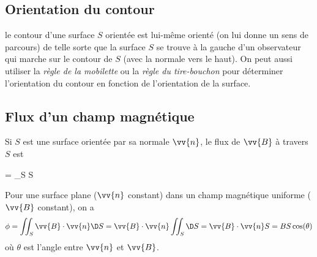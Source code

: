 \documentclass{cours}
\begin{document}
\subsection{Orientation du contour}%
\label{sub:orientation_du_contour}
le contour d'une surface $S$ orientée est lui-même orienté (on lui donne un sens de parcours) de telle sorte que la surface $S$ se trouve à la gauche d'un observateur qui marche sur le contour de $S$ (avec la normale vers le haut). On peut aussi utiliser la \emph{règle de la mobilette} ou la \emph{règle du tire-bouchon} pour déterminer l'orientation du contour en fonction de l'orientation de la surface.  
\begin{center}
  \hspace{2cm}
\end{center}

\subsection{Flux d'un champ magnétique}%
\label{sub:flux_d_un_champ_magnetique}
Si $S$ est une surface orientée par sa normale $\vv{n}$, le flux de $\vv{B}$ à travers $S$ est 
\begin{eqencadre}
  \phi = \iint_S \cdot{}\D S
\end{eqencadre}
Pour une surface plane ($\vv{n}$ constant) dans un champ magnétique uniforme ($\vv{B}$ constant), on a 
\begin{equation}
  \phi = \iint_S \vv{B}\cdot \vv{n} \D S =  \vv{B} \cdot\vv{n} \iint_S\D S = \vv{B}\cdot\vv{n}S = BS\cos(\theta )
\end{equation}
où $\theta$ est l'angle entre $\vv{n}$ et $\vv{B}$.  
\end{document}
